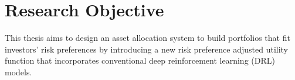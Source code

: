 \section {Research Objective}
This thesis aims to design an asset allocation system to build portfolios that fit investors' risk preferences by introducing a new risk preference adjusted utility function that incorporates conventional deep reinforcement learning (DRL) models. 